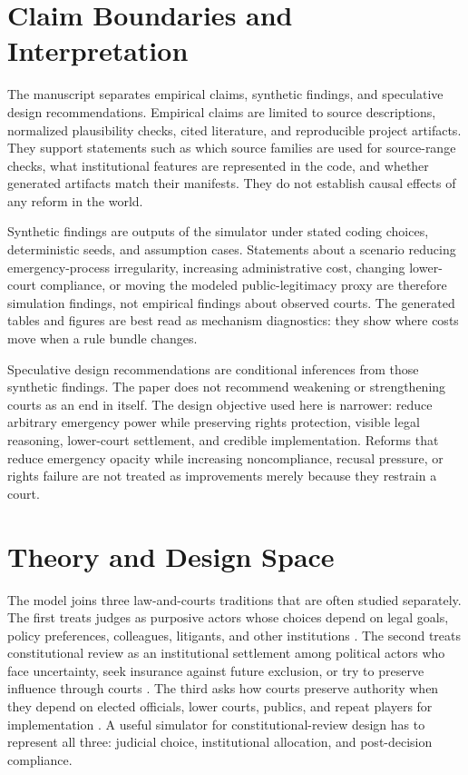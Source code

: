 \documentclass[
    journal=jlc,
    manuscript=research-article,
    year=2026,
  ]{cup-journal}
\newcommand{\jlcite}[1]{\autocite{#1}}
\newcommand{\jlcite}[1]{\citep{#1}}
\begin{document}
\section{Claim Boundaries and Interpretation}

The manuscript separates empirical claims, synthetic findings, and speculative design recommendations. Empirical claims are limited to source descriptions, normalized plausibility checks, cited literature, and reproducible project artifacts. They support statements such as which source families are used for source-range checks, what institutional features are represented in the code, and whether generated artifacts match their manifests. They do not establish causal effects of any reform in the world.

Synthetic findings are outputs of the simulator under stated coding choices, deterministic seeds, and assumption cases. Statements about a scenario reducing emergency-process irregularity, increasing administrative cost, changing lower-court compliance, or moving the modeled public-legitimacy proxy are therefore simulation findings, not empirical findings about observed courts. The generated tables and figures are best read as mechanism diagnostics: they show where costs move when a rule bundle changes.

Speculative design recommendations are conditional inferences from those synthetic findings. The paper does not recommend weakening or strengthening courts as an end in itself. The design objective used here is narrower: reduce arbitrary emergency power while preserving rights protection, visible legal reasoning, lower-court settlement, and credible implementation. Reforms that reduce emergency opacity while increasing noncompliance, recusal pressure, or rights failure are not treated as improvements merely because they restrain a court.

\section{Theory and Design Space}

The model joins three law-and-courts traditions that are often studied separately. The first treats judges as purposive actors whose choices depend on legal goals, policy preferences, colleagues, litigants, and other institutions \jlcite{SegalSpaeth2002,EpsteinKnight1998,ClaytonGillman1999}. The second treats constitutional review as an institutional settlement among political actors who face uncertainty, seek insurance against future exclusion, or try to preserve influence through courts \jlcite{Ginsburg2003,Hirschl2004,DixonGinsburg2017}. The third asks how courts preserve authority when they depend on elected officials, lower courts, publics, and repeat players for implementation \jlcite{Vanberg2005,Staton2010}. A useful simulator for constitutional-review design has to represent all three: judicial choice, institutional allocation, and post-decision compliance.
\end{document}
